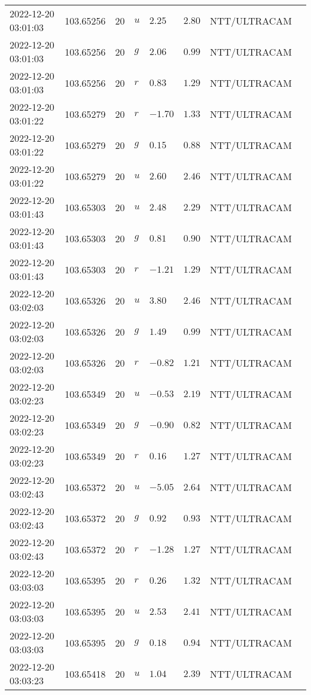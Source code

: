 \documentclass{nature_plusfigure}
\begin{document}
\begin{supplement}
\begin{center}
\begin{longtable}{llllllll}
2022-12-20 03:01:03 & 103.65256 & 20 & $u$ & $2.25$ & $2.80$ & NTT/ULTRACAM &  \\ 
2022-12-20 03:01:03 & 103.65256 & 20 & $g$ & $2.06$ & $0.99$ & NTT/ULTRACAM &  \\ 
2022-12-20 03:01:03 & 103.65256 & 20 & $r$ & $0.83$ & $1.29$ & NTT/ULTRACAM &  \\ 
2022-12-20 03:01:22 & 103.65279 & 20 & $r$ & $-1.70$ & $1.33$ & NTT/ULTRACAM &  \\ 
2022-12-20 03:01:22 & 103.65279 & 20 & $g$ & $0.15$ & $0.88$ & NTT/ULTRACAM &  \\ 
2022-12-20 03:01:22 & 103.65279 & 20 & $u$ & $2.60$ & $2.46$ & NTT/ULTRACAM &  \\ 
2022-12-20 03:01:43 & 103.65303 & 20 & $u$ & $2.48$ & $2.29$ & NTT/ULTRACAM &  \\ 
2022-12-20 03:01:43 & 103.65303 & 20 & $g$ & $0.81$ & $0.90$ & NTT/ULTRACAM &  \\ 
2022-12-20 03:01:43 & 103.65303 & 20 & $r$ & $-1.21$ & $1.29$ & NTT/ULTRACAM &  \\ 
2022-12-20 03:02:03 & 103.65326 & 20 & $u$ & $3.80$ & $2.46$ & NTT/ULTRACAM &  \\ 
2022-12-20 03:02:03 & 103.65326 & 20 & $g$ & $1.49$ & $0.99$ & NTT/ULTRACAM &  \\ 
2022-12-20 03:02:03 & 103.65326 & 20 & $r$ & $-0.82$ & $1.21$ & NTT/ULTRACAM &  \\ 
2022-12-20 03:02:23 & 103.65349 & 20 & $u$ & $-0.53$ & $2.19$ & NTT/ULTRACAM &  \\ 
2022-12-20 03:02:23 & 103.65349 & 20 & $g$ & $-0.90$ & $0.82$ & NTT/ULTRACAM &  \\ 
2022-12-20 03:02:23 & 103.65349 & 20 & $r$ & $0.16$ & $1.27$ & NTT/ULTRACAM &  \\ 
2022-12-20 03:02:43 & 103.65372 & 20 & $u$ & $-5.05$ & $2.64$ & NTT/ULTRACAM &  \\ 
2022-12-20 03:02:43 & 103.65372 & 20 & $g$ & $0.92$ & $0.93$ & NTT/ULTRACAM &  \\ 
2022-12-20 03:02:43 & 103.65372 & 20 & $r$ & $-1.28$ & $1.27$ & NTT/ULTRACAM &  \\ 
2022-12-20 03:03:03 & 103.65395 & 20 & $r$ & $0.26$ & $1.32$ & NTT/ULTRACAM &  \\ 
2022-12-20 03:03:03 & 103.65395 & 20 & $u$ & $2.53$ & $2.41$ & NTT/ULTRACAM &  \\ 
2022-12-20 03:03:03 & 103.65395 & 20 & $g$ & $0.18$ & $0.94$ & NTT/ULTRACAM &  \\ 
2022-12-20 03:03:23 & 103.65418 & 20 & $u$ & $1.04$ & $2.39$ & NTT/ULTRACAM &  \\ 

\end{longtable}
\end{center}
\end{supplement}
\end{document}
